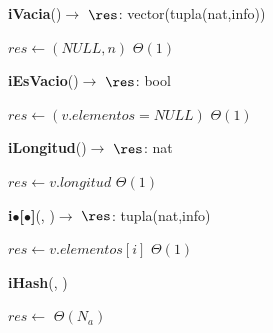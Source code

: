 \begin{Algoritmos}
\begin{algorithm}[H]{\textbf{iVacia}()$\to$ $\res$: vector(tupla(nat,info))}
	\begin{algorithmic}
            \State $res \gets (NULL,n)$		\Comment $\Theta(1)$
            
	\end{algorithmic}
\end{algorithm}

\begin{algorithm}[H]{\textbf{iEsVacio}()$\to$ $\res$: bool}
	\begin{algorithmic}
            \State $res\gets(v.elementos = NULL)$	\Comment $\Theta(1)$
            
	\end{algorithmic}
\end{algorithm}


\begin{algorithm}[H]{\textbf{iLongitud}()$\to$ $\res$: nat}
	\begin{algorithmic}
            
            \State $res \gets v.longitud$													\Comment $\Theta(1)$
           
	\end{algorithmic}
\end{algorithm}


  \begin{algorithm}[H]{\textbf{i$\bullet$[$\bullet$]}(, )$\to$ $\res$: tupla(nat,info)}
	\begin{algorithmic}
    \State $res \gets v.elementos[i]$       \Comment $\Theta(1)$    
	\end{algorithmic}
\end{algorithm}


\begin{algorithm}[H]{\textbf{iHash}(,  )}
	\begin{algorithmic}
           
            \State $res \gets$													\Comment $\Theta(N_{a})$
           
	\end{algorithmic}
\end{algorithm}

\end{Algoritmos}

